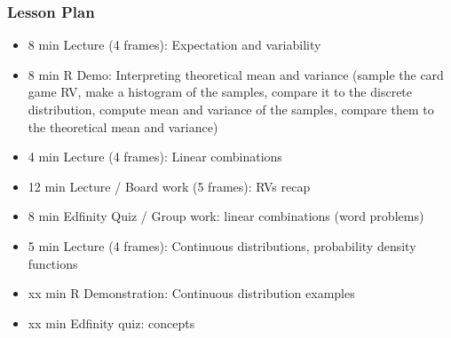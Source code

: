 \begin{frame}
    \frametitle{Lesson Plan}
    \begin{itemize}
        \item 8 min Lecture (4 frames): Expectation and variability
        \item 8 min R Demo: Interpreting theoretical mean and variance (sample the card game RV, make a histogram of the samples, compare it to the discrete distribution, compute mean and variance of the samples, compare them to the theoretical mean and variance)
        \item 4 min Lecture (4 frames): Linear combinations

        \item 12 min Lecture / Board work (5 frames): RVs recap
        \item 8 min Edfinity Quiz / Group work: linear combinations (word problems)
        \item 5 min Lecture (4 frames): Continuous distributions, probability density functions
        \item xx min R Demonstration: Continuous distribution examples
        \item xx min Edfinity quiz: concepts
    \end{itemize}
\end{frame}

